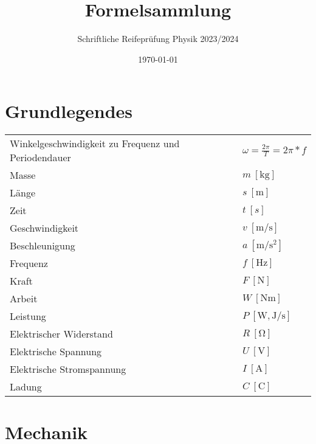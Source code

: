 \documentclass[11pt,a4paper]{paper}
\makeatletter
\newcommand{\mathleft}{\@fleqntrue\@mathmargin0pt}
\makeatother
\begin{document}
\title{Formelsammlung}
\subtitle{Schriftliche Reifeprüfung Physik 2023/2024}
\author{}
\date{\today}
\maketitle
\smalltableofcontents
\mathleft
\section{Grundlegendes}
\begin{tabularx}{\textwidth}{X|X}
	Winkelgeschwindigkeit zu Frequenz und Periodendauer & $\omega = \frac{2\pi}{T}=2\pi*f$ \\
	Masse & $m\: [\unit{\kilo\gram}]$ \\
	Länge & $s\: [\unit{\meter}]$\\
Zeit & $t\:[s]$\\
Geschwindigkeit & $v\:[\unit{\meter\per\second}]$\\
Beschleunigung & $a\:[\unit{\meter\per\second\squared}]$\\
Frequenz & $f\: [\unit{\hertz}]$\\
Kraft & $F\: [\unit{\newton}]$\\
Arbeit & $W \: [\unit{\newton\meter}]$\\
Leistung & $P \: [\unit{\watt},\unit{\joule\per\second}]$\\
Elektrischer Widerstand & $R\:[\unit{\ohm}]$\\
Elektrische Spannung & $U\:[\unit{\volt}]$\\
Elektrische Stromspannung & $I\:[\unit{\ampere}]$\\
Ladung & $C\:[\unit{\coulomb}]$
\end{tabularx}

\section{Mechanik}
\mathleft
\end{document}
